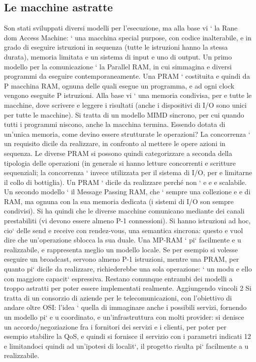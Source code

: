\documentclass[a4paper,12pt]{article}
\begin{document}
\subsection{Le macchine astratte}
Son stati sviluppati diversi modelli per l'esecuzione, ma alla base vi ` la Rane
dom Access Machine: ` una macchina special purpose, con codice inalterabile,
e
in grado di eseguire istruzioni in sequenza (tutte le istruzioni hanno la stessa
durata), memoria limitata e un sistema di input e uno di output.
Un primo modello per la comunicazione ` la Parallel RAM, in cui simmagina
e
diversi programmi da eseguire contemporaneamente. Una PRAM ` costituita
e
quindi da P macchina RAM, ognuna delle quali esegue un programma, e ad ogni
clock vengono eseguite P istruzioni. Alla base vi ` una memoria condivisa, per
e
tutte le macchine, dove scrivere e leggere i risultati (anche i dispositivi di I/O
sono unici per tutte le macchine). Si tratta di un modello MIMD sincrono, per
cui quando tutti i programmi niscono, anche la macchina termina. Essendo
dotata di un'unica memoria, come devino essere strutturate le operazioni? La
concorrenza ` un requisito dicile da realizzare, in confronto al mettere le opere
azioni in sequenza. Le diverse PRAM si possono quindi categorizzare a seconda
della tipologia delle operazioni (in generale si hanno letture concorrenti e scritture sequenziali; la concorrenza `
invece utilizzata per il sistema di I/O, per
e
limitarne il collo di bottiglia). Un PRAM ` dicile da realizzare perché non `
e
e
e
scalabile.
Un secondo modello ` il Message Passing RAM, che ` sempre una collezione
e
e
di RAM, ma ognuna con la sua memoria dedicata (i sistemi di I/O son sempre
condivisi). Si ha quindi che le diverse macchine comunicano mediante dei canali
prestabiliti (vi devono essere almeno P-1 connessioni). Si hanno istruzioni ad
hoc, cio` delle send e receive con rendez-vous, una semantica sincrona: questo
e
vuol dire che un'operazione sblocca la sua duale. Una MP-RAM ` pi` facilmente
e u
realizzabile, e rappresenta meglio un modello locale. Se per esempio si volesse
eseguire un broadcast, servono almeno P-1 istruzioni, mentre una PRAM, per
quanto pi` dicile da realizzare, richiederebbe una sola operazione: ` un modu
e
ello con maggiore capacit` espressiva. Restano comunque entrambi dei modelli
a
troppo astratti per poter essere implementati realmente. Aggiungendo vincoli
2 Si tratta di un consorzio di aziende per le telecomunicazioni, con l'obiettivo di andare
oltre OSI: l'idea ` quella di immaginare anche i possibili servizi, fornendo un modello pi`
e
u
coordinato, e un'infrastruttura con molti provider: si denisce un accordo/negoziazione fra i
fornitori dei servizi e i clienti, per poter per esempio stabilire la QoS, e quindi si fornisce il
servizio con i parametri indicati
12
\newpage
e limitandoci quindi ad un'ipotesi di localit`, il progetto risulta pi` facilmente
a
u
realizzabile.
\end{document}
